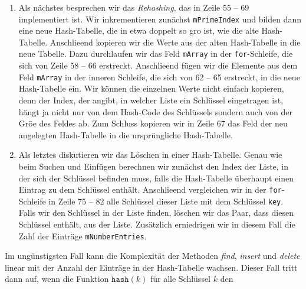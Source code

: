 \begin{enumerate}
      Anschlie\3end durchlaufen wir die Liste und suchen den Schl\"ussel \texttt{key}.
      Wenn wir den Schl\"ussel finden, dann wird einfach der zugeh\"orige Wert \"uberschrieben.
      Wenn wir den Schl\"ussel \texttt{key} in der Liste nicht finden, dann f\"ugen wir den
      Schl\"ussel zusammen mit dem zugeordneten Wert \texttt{value} in Zeile 52 an das Ende der Liste an.
      Gleichzeitig m\"ussen wir in diesem Fall die Zahl der Eintr\"age \texttt{mNumberEntries}
      inkrementieren.
\item Als n\"achstes besprechen wir das \emph{Rehashing}, das in Zeile 55 -- 69
      implementiert ist.  Wir inkrementieren zun\"achst \texttt{mPrimeIndex} und
      bilden dann eine neue Hash-Tabelle, die in etwa doppelt so gro\3 ist, wie die alte
      Hash-Tabelle. Anschlie\3end kopieren wir die Werte aus der alten Hash-Tabelle in die
      neue Tabelle.  Dazu durchlaufen wir das Feld \texttt{mArray} in der
      \texttt{for}-Schleife, die sich von Zeile 58 -- 66 erstreckt.
      Anschlie\3end f\"ugen wir die Elemente aus dem Feld \texttt{mArray} in der inneren
      Schleife, die sich von 62 -- 65 erstreckt, in die neue Hash-Tabelle ein.
      Wir k\"onnen die einzelnen Werte nicht einfach kopieren, denn der Index, der angibt,
      in welcher Liste ein Schl\"ussel eingetragen ist, h\"angt ja nicht nur von dem
      Hash-Code des Schl\"ussels sondern auch von der Gr\"o\3e des Feldes ab.
      Zum Schluss kopieren wir in Zeile 67  das Feld der neu angelegten Hash-Tabelle in die
      urspr\"ungliche Hash-Tabelle.
\item Als letztes diskutieren wir das L\"oschen in einer Hash-Tabelle.
      Genau wie beim Suchen und Einf\"ugen berechnen wir zun\"achst den Index der Liste, in
      der sich der Schl\"ussel befinden muss, falls die Hash-Tabelle \"uberhaupt einen Eintrag
      zu dem Schl\"ussel enth\"alt.  Anschlie\3end vergleichen wir in der \texttt{for}-Schleife
      in Zeile 75 -- 82 alle Schl\"ussel dieser Liste mit dem Schl\"ussel \texttt{key}.
      Falls wir den Schl\"ussel in der Liste finden, l\"oschen wir das Paar, dass diesen
      Schl\"ussel enth\"alt, aus  der Liste.  Zus\"atzlich erniedrigen wir in diesem Fall die
      Zahl der Eintr\"age \texttt{mNumberEntries}.
      
\end{enumerate}
Im ung\"unstigsten Fall kann die Komplexit\"at der Methoden \textsl{find}, \textsl{insert} und
\textsl{delete} linear mit der Anzahl der Eintr\"age in der Hash-Tabelle wachsen.  Dieser
Fall tritt dann auf, wenn die Funktion $\texttt{hash}(k)$ f\"ur alle Schl\"ussel $k$ den
